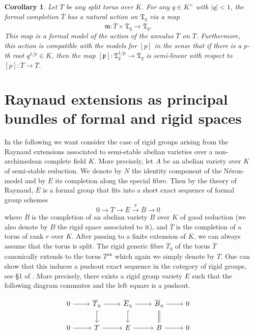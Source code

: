\documentclass[11pt,oneside]{amsart}
\newtheorem{corollary}[theorem]{Corollary}
\theoremstyle{definition}
\theoremstyle{remark}
\begin{document}
	\begin{corollary}\label{action on formal model of torus}
		Let $T$ be any split torus over $K$. For any $q\in K^\times$ with $|q|<1$, the formal completion $\overline{T}$ has a natural action on $\mathfrak T_q$ via a map
		\[\mathfrak m:\overline{T}\times \mathfrak T_q\rightarrow \mathfrak T_q.\]
		This map is a formal model of the action of the annulus $\overline{T}$ on $T$. Furthermore, this action is compatible with the models for $[p]$ in the sense that if there is a $p$-th root $q^{1/p}\in K$, then the map $[\mathfrak p]:\mathfrak T_q^{1/p}\rightarrow \mathfrak T_q$ is semi-linear with respect to $[p]:\overline{T}\rightarrow \overline{T}$.
	\end{corollary} 
	
	\section{Raynaud extensions as principal bundles of formal and rigid spaces}
	In the following we want consider the case of rigid groups arising from the Raynaud extensions associated to semi-stable abelian varieties over a non-archimedean complete field $K$. More precisely, let $A$ be an abelian variety over $K$ of semi-stable reduction. We denote by $N$ the identity component of the N\'eron-model and by $\overline E$ its completion along the special fibre. Then by the theory of Raynaud, $\overline E$ is a formal group that fits into a short exact sequence of formal group schemes
	\begin{equation}\label{formal Raynaud extension}
	0\rightarrow \overline T \rightarrow \overline E \xrightarrow{\pi} \overline{B}\rightarrow 0
	\end{equation}
	where $\overline{B}$ is the completion of an abelian variety $B$ over $K$ of good reduction (we also denote by $B$ the rigid space associated to it), and $\overline{T}$ is the completion of a torus of rank $r$ over $K$.
	After passing to a finite extension of $K$, we can always assume that the torus is split. The rigid generic fibre $\overline{T}_\eta$ of the torus $\overline{T}$ canonically extends to the torus $T^{\operatorname{an}}$ which again we simply denote by $T$. One can show that this induces a pushout exact sequence in the category of rigid groups, see \S 1 of \cite{BL}. More precisely, there exists a rigid group variety $E$ such that the following diagram commutes and the left square is a pushout.
	\begin{center}
		\begin{equation}
		\begin{tikzcd}
			0 \arrow[r] & \overline{T}_\eta \arrow[d, hook] \arrow[r] & \overline{E}_\eta \arrow[d, hook] \arrow[r] & \overline{B}_\eta \arrow[d,equal] \arrow[r] & 0 \\
			0 \arrow[r] & T \arrow[r] & E \arrow[r] & B \arrow[r] & 0
		\end{tikzcd}
		\end{equation}
	\end{center}
	
\end{document}
